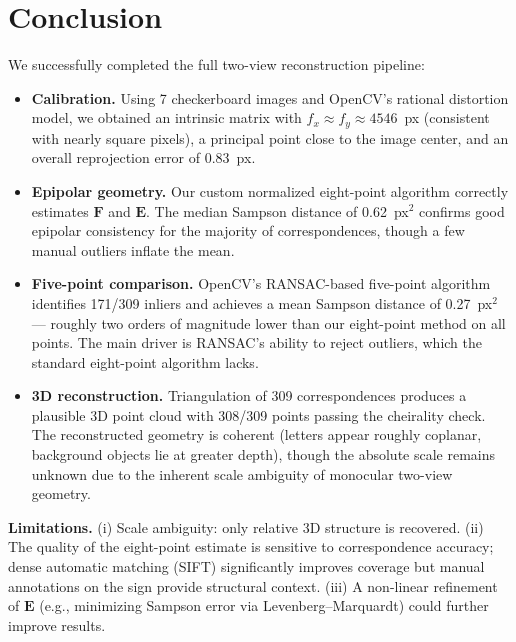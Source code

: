 \documentclass{article}
\begin{document}
%
%

\section{Conclusion}
We successfully completed the full two-view reconstruction pipeline:
\begin{itemize}
\item \textbf{Calibration.} Using 7 checkerboard images and OpenCV's rational distortion model, we obtained an intrinsic matrix with $f_x\approx f_y\approx 4546$~px (consistent with nearly square pixels), a principal point close to the image center, and an overall reprojection error of 0.83~px.
\item \textbf{Epipolar geometry.} Our custom normalized eight-point algorithm correctly estimates $\mathbf{F}$ and $\mathbf{E}$. The median Sampson distance of 0.62~px$^2$ confirms good epipolar consistency for the majority of correspondences, though a few manual outliers inflate the mean.
\item \textbf{Five-point comparison.} OpenCV's RANSAC-based five-point algorithm identifies 171/309 inliers and achieves a mean Sampson distance of 0.27~px$^2$ --- roughly two orders of magnitude lower than our eight-point method on all points. The main driver is RANSAC's ability to reject outliers, which the standard eight-point algorithm lacks.
\item \textbf{3D reconstruction.} Triangulation of 309 correspondences produces a plausible 3D point cloud with 308/309 points passing the cheirality check. The reconstructed geometry is coherent (letters appear roughly coplanar, background objects lie at greater depth), though the absolute scale remains unknown due to the inherent scale ambiguity of monocular two-view geometry.
\end{itemize}
\textbf{Limitations.} (i) Scale ambiguity: only relative 3D structure is recovered. (ii) The quality of the eight-point estimate is sensitive to correspondence accuracy; dense automatic matching (SIFT) significantly improves coverage but manual annotations on the sign provide structural context. (iii) A non-linear refinement of $\mathbf{E}$ (e.g., minimizing Sampson error via Levenberg--Marquardt) could further improve results.
\end{document}
